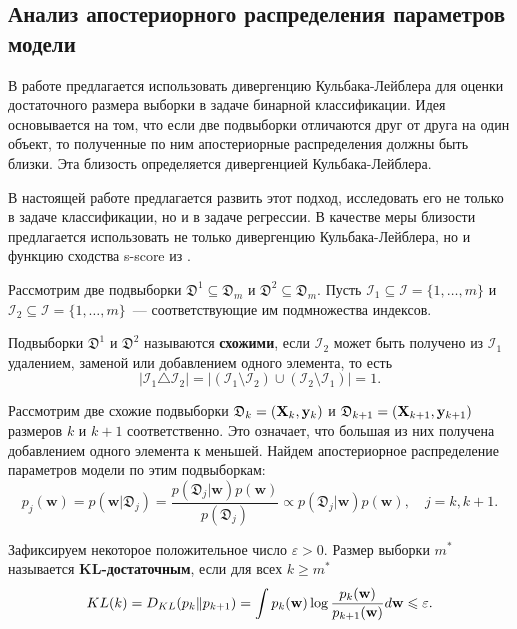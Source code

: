 \subsection{Анализ апостериорного распределения параметров модели}

В работе \citep{MOTRENKO2014743} предлагается использовать дивергенцию Кульбака-Лейблера для оценки достаточного размера выборки в задаче бинарной классификации. Идея основывается на том, что если две подвыборки отличаются друг от друга на один объект, то полученные по ним апостериорные распределения должны быть близки. Эта близость определяется дивергенцией Кульбака-Лейблера. 

В настоящей работе предлагается развить этот подход, исследовать его не только в задаче классификации, но и в задаче регрессии. В качестве меры близости предлагается использовать не только дивергенцию Кульбака-Лейблера, но и функцию сходства s-score из \citep{Aduenko2017}.

Рассмотрим две подвыборки $\mathfrak{D}^1 \subseteq \mathfrak{D}_m$ и $\mathfrak{D}^2 \subseteq \mathfrak{D}_m$. Пусть $\mathcal{I}_1 \subseteq \mathcal{I} = \{ 1, \ldots, m \}$ и $\mathcal{I}_2 \subseteq \mathcal{I} = \{ 1, \ldots, m \}$~--- соответствующие им подмножества индексов.

\begin{definition}
    Подвыборки $\mathfrak{D}^1$ и $\mathfrak{D}^2$ называются \textbf{схожими}, если $\mathcal{I}_2$ может быть получено из $\mathcal{I}_1$ удалением, заменой или добавлением одного элемента, то есть
    \[ \left| \mathcal{I}_1 \triangle \mathcal{I}_2 \right| = \left| \left( \mathcal{I}_1 \setminus \mathcal{I}_2 \right) \cup \left( \mathcal{I}_2 \setminus \mathcal{I}_1 \right) \right| = 1. \]
\end{definition}

Рассмотрим две схожие подвыборки $\mathfrak{D}_k = (\mathbf{X}_k, \mathbf{y}_k)$ и $\mathfrak{D}_{k+1} = (\mathbf{X}_{k+1}, \mathbf{y}_{k+1})$ размеров $k$ и $k+1$ соответственно. Это означает, что большая из них получена добавлением одного элемента к меньшей. Найдем апостериорное распределение параметров модели по этим подвыборкам:
\[p_j(\mathbf{w}) = p(\mathbf{w} | \mathfrak{D}_j) = \dfrac{p(\mathfrak{D}_j | \mathbf{w}) p(\mathbf{w})}{p(\mathfrak{D}_j)} \propto p(\mathfrak{D}_j | \mathbf{w}) p(\mathbf{w}), \quad j = k, k+1. \]

\begin{definition}
    Зафиксируем некоторое положительное число $\varepsilon > 0$. Размер выборки $m^*$ называется \textbf{KL-достаточным}, если для всех $k \geqslant m^*$
    \[ KL(k) = D_{KL}(p_k \| p_{k+1}) = \int p_k(\mathbf{w}) \log{\dfrac{p_k(\mathbf{w})}{p_{k+1}(\mathbf{w})}} d\mathbf{w} \leqslant \varepsilon. \]
\end{definition}

